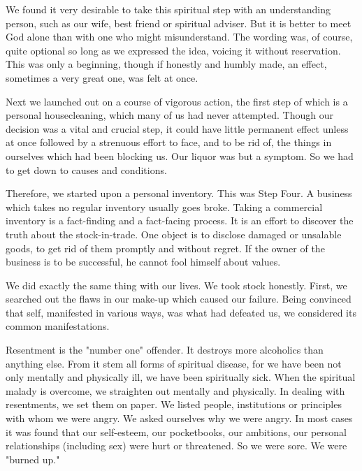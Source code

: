 \begin{biblechapter}
\verse We found it very desirable to 
    take this spiritual step with an understanding person, 
    such as our wife, best friend or spiritual adviser.
\verse But it is better to meet God alone 
    than with one who might misunderstand.
\verse The wording was, of course, quite optional 
    so long as we expressed the idea, 
    voicing it without reservation.
\verse This was only a beginning, 
    though if honestly and humbly made, 
    an effect, sometimes a very great one, 
    was felt at once.
\end{biblechapter}


\begin{biblechapter}
\verse Next we launched out on a course of vigorous action, 
    the first step of which is a personal housecleaning, 
    which many of us had never attempted.
\verse Though our decision was a vital and crucial step, 
    it could have little permanent effect 
    unless at once followed by a strenuous effort to face, 
    and to be rid of, 
    the things in ourselves which had been blocking us.
\verse Our liquor was but a symptom.
\verse So we had to get down to causes and conditions.

\verse Therefore, we started upon a personal inventory.
\verse This was Step Four.
\verse A business which takes no regular inventory usually goes broke.
\verse Taking a commercial inventory is a fact-finding 
    and a fact-facing process.
\verse It is an effort to discover the truth about the stock-in-trade.
\verse One object is to disclose damaged or unsalable goods, 
    to get rid of them promptly and without regret.
\verse If the owner of the business is to be successful, 
    he cannot fool himself about values.

\verse We did exactly the same thing with our lives.
\verse We took stock honestly.
\verse First, we searched out the flaws in our make-up 
    which caused our failure.
\verse Being convinced that self, manifested in various ways, 
    was what had defeated us, 
    we considered its common manifestations.

\verse Resentment is the "number one" offender.
\verse It destroys more alcoholics than anything else.
\verse From it stem all forms of spiritual disease, 
    for we have been not only mentally and physically ill, 
    we have been spiritually sick.
\verse When the spiritual malady is overcome, 
    we straighten out mentally and physically.
\verse In dealing with resentments, we set them on paper.
\verse We listed people, institutions or principles 
    with whom we were angry.
\verse We asked ourselves why we were angry.
\verse In most cases it was found that 
    our self-esteem, 
    our pocketbooks, 
    our ambitions, 
    our personal relationships (including sex) 
    were hurt or threatened.
\verse So we were sore.
\verse We were "burned up."


\end{biblechapter}

